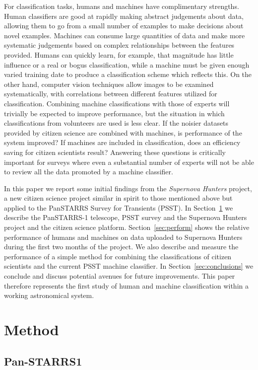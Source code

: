 \documentclass[a4paper,fleqn,usenatbib]{mnras}
\begin{document}
For classification tasks, humans and machines have complimentary strengths. Human classifiers are good at rapidly making abstract judgements about data, allowing them to go from a small number of examples to make decisions about novel examples. Machines can consume large quantities of data and make more systematic judgements based on complex relationships between the features provided.  Humans can quickly learn, for example, that magnitude has little influence or a real or bogus classification, while a machine must be given enough varied training date to produce a classification scheme which reflects this. On the other hand, computer vision techniques allow images to be examined systematically, with correlations between different features utilized for classification. Combining machine classifications with those of experts will trivially be expected to improve performance, but the situation in which classifications from volunteers are used is less clear. If the noisier datasets provided by citizen science are combined with machines, is performance of the system improved? If machines are included in classification, does an efficiency saving for citizen scientists result? Answering these questions is critically important for surveys where even a substantial number of experts will not be able to review all the data promoted by a machine classifier. 

In this paper we report some initial findings from the \textit{Supernova Hunters} project, a new citizen science project similar in spirit to those mentioned above but applied to the PanSTARRS Survey for Transients (PSST).  In Section~\ref{sec:method} we describe the PanSTARRS-1 telescope, PSST survey and the Supernova Hunters project and the citizen science platform.  Section~\ref{sec:perform} shows the relative performance of humans and machines on data uploaded to Supernova Hunters during the first two months of the project.  We also describe and measure the performance of a simple method for combining the classifications of citizen scientists and the current PSST machine classifier.  In Section~\ref{sec:conclusions} we conclude and discuss potential avenues for future improvements. This paper therefore represents the first study of human and machine classification within a working astronomical system. 

\section{Method}
\label{sec:method}
\subsection{Pan-STARRS1}
\label{sec:ps1}
\end{document}
